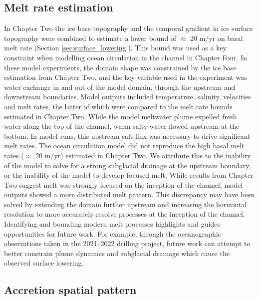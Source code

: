 \subsection{Melt rate estimation}

In Chapter Two the ice base topography and the temporal gradient in ice surface topography were combined to estimate a lower bound of $\approx$ 20 m/yr on basal melt rate (Section \ref{sec:surface_lowering}). This bound was used as a key constraint when modelling ocean circulation in the channel in Chapter Four. 
In these model experiments, the domain shape was constrained by the ice base estimation from Chapter Two, and the key variable used in the experiment was water exchange in and out of the model domain, through the upstream and downstream boundaries. Model outputs included temperature, salinity, velocities and melt rates, the latter of which  were compared to the melt rate bounds estimated in Chapter Two. 
While the model meltwater plume expelled fresh water along the top of the channel, warm salty water flowed upstream at the bottom. In model runs, this upstream salt flux was necessary to drive significant melt rates.
The ocean circulation model did not reproduce the high basal melt rates ($\approx$ 20 m/yr) estimated in Chapter Two. We attribute this to the inability of the model to solve for a strong subglacial drainage at the upstream boundary, or the inability of the model to develop focused melt. While results from Chapter Two suggest melt was strongly focused on the inception of the channel, model outputs showed a more distributed melt pattern. This discrepancy may have been solved by extending the domain further upstream and increasing the horizontal resolution to more accurately resolve processes at the inception of the channel. 
Identifying and bounding modern melt processes highlights and guides opportunities for future work. For example, through the oceanographic observations taken in the 2021--2022 drilling project, future work can attempt to better constrain plume dynamics and subglacial drainage which cause the observed surface lowering.  

\subsection{Accretion spatial pattern}

